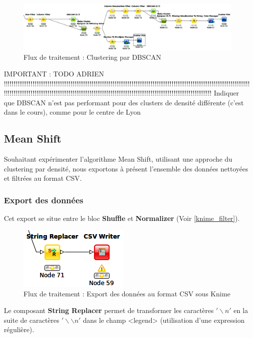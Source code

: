 \begin{figure}[H]
    \centering
    \includegraphics[width=\linewidth]{img/knime_dbscan.png}
    \caption{Flux de traitement : Clustering par DBSCAN}
\end{figure}



IMPORTANT : TODO ADRIEN !!!!!!!!!!!!!!!!!!!!!!!!!!!!!!!!!!!!!!!!!!!!!!!!!!!!!!!!!!!!!!!!!!!!!!!!!!!!!!!!!!!!!!!!!!!!!!!!!!!!!!!!!!!!!!!!!!!!!!!!!!!!!!!!!!!!!!!!!!!!!!!!!!!!!!!!!!!!!!!!!!!!!!!!!!!!!!!!!!!!!!!!!!!!!!!!!!!!!!!!!!!!!!!!!!!!!!!!!!!!!!!!!!!!!!!!!!!!!!
Indiquer que DBSCAN n'est pas performant pour des clusters de densité différente (c'est dans le cours), comme pour le centre de Lyon
\pagebreak




\subsection{Mean Shift}
Souhaitant expérimenter l'algorithme Mean Shift, utilisant une approche du clustering par densité, nous exportons à présent l'ensemble des données nettoyées et filtrées au format CSV.

\subsubsection{Export des données}
Cet export se situe entre le bloc \textbf{Shuffle} et \textbf{Normalizer} (Voir \ref{knime_filter}).

\begin{figure}[H]
    \centering
    \includegraphics[width=0.25\linewidth]{img/knime_csvwriter.png}
    \caption{Flux de traitement : Export des données au format CSV sous Knime}
\end{figure}

Le composant \textbf{String Replacer} permet de transformer les caractères $'\backslash n'$ en la suite de caractères $'\backslash \backslash n'$ dans le champ <legend> (utilisation d'une expression régulière).

